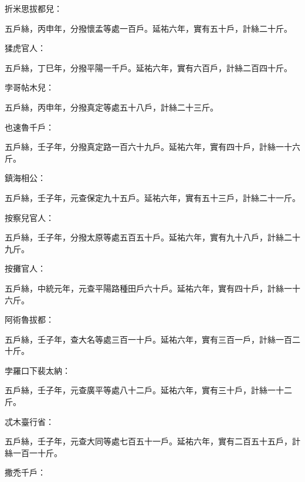 \begin{pinyinscope}
 折米思拔都兒：



 五戶絲，丙申年，分撥懷孟等處一百戶。延祐六年，實有五十戶，計絲二十斤。



 猱虎官人：



 五戶絲，丁巳年，分撥平陽一千戶。延祐六年，實有六百戶，計絲二百四十斤。



 孛哥帖木兒：



 五戶絲，丙申年，分撥真定等處五十八戶，計絲二十三斤。



 也速魯千戶：



 五戶絲，壬子年，分撥真定路一百六十九戶。延祐六年，實有四十戶，計絲一十六斤。



 鎮海相公：



 五戶絲，壬子年，元查保定九十五戶。延祐六年，實有五十三戶，計絲二十一斤。



 按察兒官人：



 五戶絲，壬子年，分撥太原等處五百五十戶。延祐六年，實有九十八戶，計絲二十九斤。



 按攤官人：



 五戶絲，中統元年，元查平陽路種田戶六十戶。延祐六年，實有四十戶，計絲一十六斤。



 阿術魯拔都：



 五戶絲，壬子年，查大名等處三百一十戶。延祐六年，實有三百一戶，計絲一百二十斤。



 孛羅口下裴太納：



 五戶絲，壬子年，元查廣平等處八十二戶。延祐六年，實有三十戶，計絲一十二斤。



 忒木臺行省：



 五戶絲，壬子年，元查大同等處七百五十一戶。延祐六年，實有二百五十五戶，計絲一百一十斤。



 撒禿千戶：




\end{pinyinscope}
